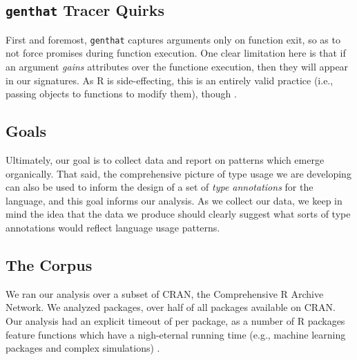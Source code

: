 \documentclass[acmsmall,10pt,review,anonymous]{acmart}\settopmatter{printfolios=true,printccs=false,printacmref=false}
\begin{document}


%
%
%
%
\subsection{{\tt genthat} Tracer Quirks}

First and foremost, {\tt genthat} captures arguments only on function exit,
so as to not force promises during function execution.   One
clear limitation here is that if an argument \textit{gains} attributes over
the functione execution, then they will appear in our signatures.  As R is
side-effecting, this is an entirely valid practice (i.e., passing objects to
functions to modify them), though .


%
%
%
%
\subsection{Goals}

Ultimately, our goal is to collect data and report on patterns which emerge
organically.  That said, the comprehensive picture of type usage we are
developing can also be used to inform the design of a set of \textit{type
  annotations} for the language, and this goal informs our analysis.  As we
collect our data, we keep in mind the idea that the data we produce should
clearly suggest what sorts of type annotations would reflect language usage
patterns.

%
%
%
%
\subsection{The Corpus}


We ran our analysis over a subset of CRAN, the Comprehensive R Archive Network.
We analyzed  packages, over half of all packages available on CRAN.
Our analysis had an explicit timeout of  per package, as a number of R packages feature functions which have a nigh-eternal running time (e.g., machine learning packages and complex simulations) .
\end{document}
